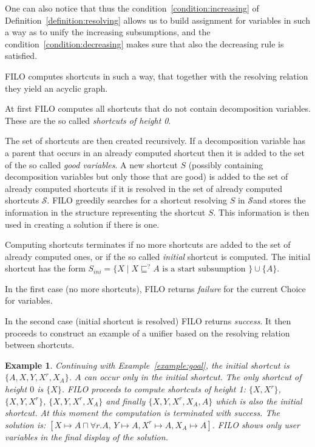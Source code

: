 \documentclass{article}
\newtheorem{example}{Example}
\newcommand{\wrt}{w.r.t.\ }
\renewcommand{\S}{\ensuremath{\mathcal{S}}}
\begin{document}
One can also notice that thus the condition~\ref{condition:increasing} of Definition~\ref{definition:resolving} allows us to build assignment for variables in such a way as to unify
the increasing subsumptions, and the condition~\ref{condition:decreasing} makes sure that also the decreasing rule is satisfied.

FILO computes shortcuts in such a way, that together with the resolving relation they yield an acyclic graph.

At first FILO computes all shortcuts that do not contain decomposition variables. These are the so called \emph{shortcuts of height 0}. 

The set of shortcuts are then created recursively. If a decomposition variable has a parent that occurs in an already computed shortcut then it is added to the set of the so called \emph{good variables}. 
A new shortcut $S$ (possibly containing decomposition variables  but only those that are good) is added to 
the set of already computed shortcuts if it is resolved in the set of already computed shortcuts \S.
FILO greedily searches for a shortcut resolving $S$ in \S and stores the information in the structure
representing the shortcut $S$. This information is then used in creating a solution if there is one.

Computing shortcuts terminates if no more shortcuts are added to the set of already computed ones, or
if the so called \emph{initial} shortcut is computed.
The initial shortcut has the form $S_{ini} = \{X \mid X \sqsubseteq^? A \text{ is a start subsumption }\} \cup \{A\}$.

In the first case (no more shortcuts), FILO returns \emph{failure} for the current Choice for variables.

In the second case (initial shortcut is resolved) FILO returns \emph{success}. It then proceeds to construct an example of a unifier based
on the resolving relation between shortcuts. 

\begin{example}
	Continuing with Example~\ref{example:goal}, the initial shortcut is $\{A, X, Y, X^r, X_A \}$.
	$A$ can occur only in the initial shortcut.
	The only shortcut of height $0$ is $\{X\}$. FILO proceeds to compute shortcuts of height 1: $\{X, X^r\}$, $\{X, Y, X^r\}$,  $\{X, Y, X^r, X_A\}$ and finally
	 $\{X, Y, X^r, X_A, A\}$ which is also the initial shortcut. At this moment the computation is terminated with \emph{success}.
	 The solution is: $[X \mapsto A \sqcap \forall r.A,\, Y \mapsto A, X^r \mapsto A, X_A \mapsto A]$. FILO shows only user variables in the final display of the solution.
\end{example}
\end{document}
